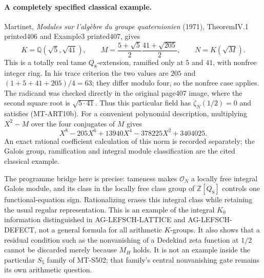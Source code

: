 \paragraph{A completely specified classical example.}
Martinet, \emph{Modules sur l'alg\`ebre du groupe quaternionien}
(1971), TheoremIV.1 printed406 and Example3 printed407, gives
\[
 K=\mathbb Q(\sqrt5,\sqrt{41}),\qquad
 M=\frac{5+\sqrt5}{2}\frac{41+\sqrt{205}}{2},\qquad
 N=K(\sqrt M).
 \tag{MT-ART10c}
\]
This is a totally real tame $Q_8$-extension, ramified only at
$5$ and $41$, with nonfree integer ring. In his trace criterion
the two values are $205$ and $(1+5+41+205)/4=63$; they differ
modulo four, so the nonfree case applies. The radicand was
checked directly in the original page407 image, where the
second square root is $\sqrt{5\cdot41}$.
Thus this particular field has $\zeta_N(1/2)=0$ and satisfies
(MT-ART10b). For a convenient polynomial description, multiplying
$X^2-M$ over the four conjugates of $M$ gives
\[
 X^8-205X^6+13940X^4-378225X^2+3404025.
 \tag{MT-ART10d}
\]
An exact rational coefficient calculation of this norm is
recorded separately; the Galois group, ramification and integral
module classification are the cited classical example.

The programme bridge here is precise: tameness makes
$\mathcal O_N$ a locally free integral Galois module, and its
class in the locally free class group of $\mathbb Z[Q_8]$
controls one functional-equation sign. Rationalizing erases
this integral class while retaining the usual regular
representation. This is an example of the integral $K_0$
information distinguished in AG-LEFSCH-LATTICE and
AG-LEFSCH-DEFECT, not a general formula for all arithmetic
$K$-groups. It also shows that a residual condition such as
the nonvanishing of a Dedekind zeta function at $1/2$ cannot
be discarded merely because $M_H$ holds. It is not an example
inside the particular $S_5$ family of MT-S502; that family's
central nonvanishing gate remains its own arithmetic question.


